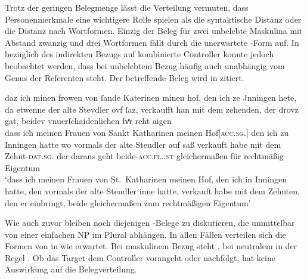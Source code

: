 Trotz der geringen Belegmenge lässt die Verteilung vermuten, dass
Personenmerkmale eine wichtigere Rolle spielen als die syntaktische Distanz
oder die Distanz nach Wortformen. Einzig der Beleg für zwei unbelebte Maskulina
mit Abstand zwanzig und drei Wortformen fällt durch die unerwartete
-Form auf. In  bezüglich des
indirekten Bezugs auf kombinierte Controller konnte jedoch beobachtet werden,
dass bei unbelebtem Bezug häufig auch unab\-hängig vom Genus der Referenten
 steht. Der betreffende Beleg wird in 
zitiert.

\begin{exe}
\ex\label{ex:n241_hofzehnt}
	\setlength{\glossglue}{5pt plus 2pt minus 1pt}
	\gll daz ich minen frowen von ſande Katerinen minen hof, den ich ze
			Jnningen hete, da etwenne der alte Stevdler ovf ſaz, verkaufft han
			mit dem zehenden, der drovz gat, beidev vnuerſchaidenlichen fvͤr
			reht aigen \\
		dass ich meinen Frauen von Sankt Katharinen meinen
			Hof[\textsc{acc.sg.\MascI}] den ich zu Inningen hatte wo vormals
			der alte Steudler auf saß verkauft habe mit dem
			Zehnt-\textsc{dat.sg.\MascI} der daraus geht
			beide-\textsc{acc.pl.\NeutI.st} gleichermaßen für rechtmäßig
			Eigentum \\
	\trans `dass ich meinen Frauen von St.~Katharinen meinen Hof, den ich
		in Inningen hatte, den vormals der alte Steudler inne hatte, verkauft
		habe  mit dem Zehnten, den er einbringt, beide
		gleichermaßen zum rechtmäßigen Eigentum'
		\parencites(Nr.~N~241, Mainau und Konstanz, 1275)[195,37--38]{cao5}
\end{exe}

Wie auch zuvor bleiben noch diejenigen -Belege zu diskutieren,
die unmittelbar von einer einfachen NP im Plural abhängen. In allen Fällen
verteilen sich die Formen von  in
 wie erwartet. Bei maskulinem Bezug steht ,
bei neutralem in der Regel . Ob das Target dem Controller
vorangeht oder nachfolgt, hat keine Auswirkung auf die Beleg\-verteilung.

